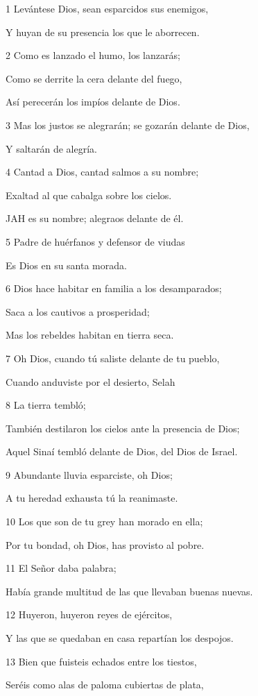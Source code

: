 \par 1 Levántese Dios, sean esparcidos sus enemigos,
\par Y huyan de su presencia los que le aborrecen.
\par 2 Como es lanzado el humo, los lanzarás;
\par Como se derrite la cera delante del fuego,
\par Así perecerán los impíos delante de Dios.
\par 3 Mas los justos se alegrarán; se gozarán delante de Dios,
\par Y saltarán de alegría.
\par 4 Cantad a Dios, cantad salmos a su nombre;
\par Exaltad al que cabalga sobre los cielos.
\par JAH es su nombre; alegraos delante de él.
\par 5 Padre de huérfanos y defensor de viudas
\par Es Dios en su santa morada.
\par 6 Dios hace habitar en familia a los desamparados;
\par Saca a los cautivos a prosperidad;
\par Mas los rebeldes habitan en tierra seca.
\par 7 Oh Dios, cuando tú saliste delante de tu pueblo,
\par Cuando anduviste por el desierto, Selah
\par 8 La tierra tembló;
\par También destilaron los cielos ante la presencia de Dios;
\par Aquel Sinaí tembló delante de Dios, del Dios de Israel.
\par 9 Abundante lluvia esparciste, oh Dios;
\par A tu heredad exhausta tú la reanimaste.
\par 10 Los que son de tu grey han morado en ella;
\par Por tu bondad, oh Dios, has provisto al pobre.
\par 11 El Señor daba palabra;
\par Había grande multitud de las que llevaban buenas nuevas.
\par 12 Huyeron, huyeron reyes de ejércitos,
\par Y las que se quedaban en casa repartían los despojos.
\par 13 Bien que fuisteis echados entre los tiestos,
\par Seréis como alas de paloma cubiertas de plata,
